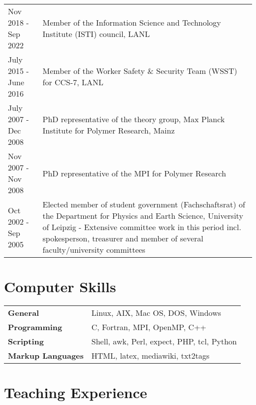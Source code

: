 \documentclass{article}
\begin{document}
\begin{tabular}{p{}p{}}
Nov 2018 - Sep 2022 & Member of the Information Science and Technology Institute (ISTI) council, LANL \\
July 2015 - June 2016 & Member of the Worker Safety \& Security Team (WSST) for CCS-7, LANL \\
July 2007 - Dec 2008 & PhD representative of the theory group, Max Planck Institute for Polymer Research, Mainz \\
Nov 2007 - Nov 2008 & PhD representative of the MPI for Polymer Research \\
Oct 2002 - Sep 2005 & Elected member of student government (Fachschaftsrat) of the Department for Physics and Earth Science, University of Leipzig - Extensive committee work in this period incl. spokesperson, treasurer and member of several faculty/university committees \\
\end{tabular}


\section*{Computer Skills}

\begin{tabular}{ll}
\textbf{General} & Linux, AIX, Mac OS, DOS, Windows \\
\textbf{Programming} & C, Fortran, MPI, OpenMP, C++ \\
\textbf{Scripting} & Shell, awk, Perl, expect, PHP, tcl, Python\\
\textbf{Markup Languages} & HTML, latex, mediawiki, txt2tags \\
\end{tabular}

\section*{Teaching Experience}
\vspace{-4mm}
\end{document}
